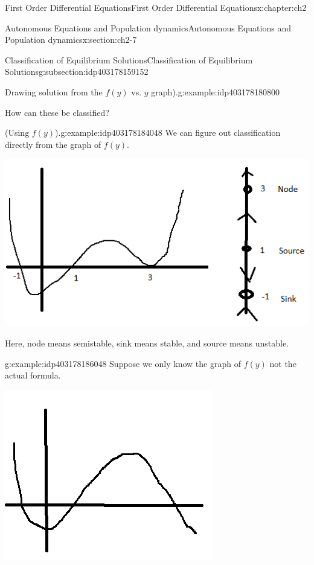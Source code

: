 \documentclass[oneside,10pt,]{book}
\numberwithin{equation}{section}
\numberwithin{equation}{section}
\begin{document}
\begin{chapterptx}{First Order Differential Equations}{}{First Order Differential Equations}{}{}{x:chapter:ch2}
\begin{sectionptx}{Autonomous Equations and Population dynamics}{}{Autonomous Equations and Population dynamics}{}{}{x:section:ch2-7}
\begin{subsectionptx}{Classification of Equilibrium Solutions}{}{Classification of Equilibrium Solutions}{}{}{g:subsection:idp403178159152}
\begin{example}{Drawing solution from the \(f(y)\) vs. \(y\) graph).}{g:example:idp403178180800}
\par
How can these be classified?%
\end{example}
\begin{example}{(Using \(f(y)\)).}{g:example:idp403178184048}%
We can figure out classification directly from the graph of \(f(y)\). \begin{image}{0}{1}{0}%
\includegraphics[width=\linewidth]{images/1.6-Classif-1.png}
\end{image}%
 Here, node means semistable, sink means stable, and source means unstable.%
\end{example}
\begin{example}{}{g:example:idp403178186048}%
Suppose we only know the graph of \(f(y)\) not the actual formula. \begin{image}{0}{1}{0}%
\includegraphics[width=\linewidth]{images/1.6-f(y).png}

\end{image}
\end{example}
\end{subsectionptx}
\end{sectionptx}
\end{chapterptx}
\end{document}
